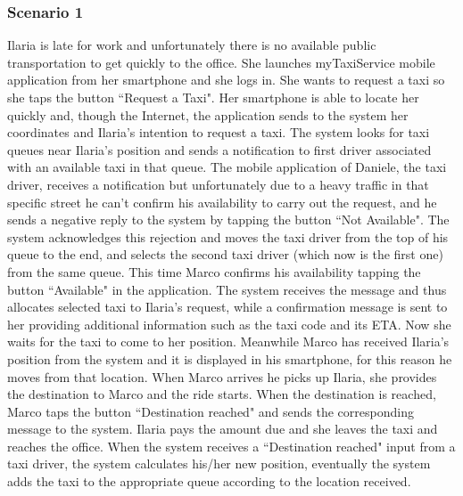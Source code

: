 \documentclass[a4paper,12pt,dvipsnames]{article}%
\begin{document}
\subsubsection{Scenario 1}
Ilaria is late for work and unfortunately there is no available public transportation to get quickly to the office. She launches myTaxiService mobile application from her smartphone and she logs in.
She wants to request a taxi so she taps the button ``Request a Taxi".
Her smartphone is able to locate her quickly and, though the Internet, the application sends to the system her coordinates and Ilaria's intention to request a taxi. The system looks for taxi queues near Ilaria's position and sends a notification to first driver associated with an available taxi in that queue.
The mobile application of Daniele, the taxi driver, receives a notification but unfortunately due to a heavy traffic in that specific street he can't confirm his availability to carry out the request, and he sends a negative reply to the system by tapping the button ``Not Available".
The system acknowledges this rejection and moves the taxi driver from the top of his queue to the end, and selects the second taxi driver (which now is the first one) from the same queue.
This time Marco confirms his availability tapping the button ``Available" in the application. The system receives the message and thus allocates selected taxi to Ilaria's request, while a confirmation message is sent to her providing additional information such as the taxi code and its ETA. Now she waits for the taxi to come to her position.
Meanwhile Marco has received Ilaria's position from the system and it is displayed in his smartphone, for this reason he moves from that location.
When Marco arrives he picks up Ilaria, she provides the destination to Marco and the ride starts.
When the destination is reached, Marco taps the button ``Destination reached" and sends the corresponding message to the system. Ilaria pays the amount due and she leaves the taxi and reaches the office. When the system receives a ``Destination reached" input from a taxi driver, the system calculates his/her new position, eventually the system adds the taxi to the appropriate queue according to the location received.
\end{document}
